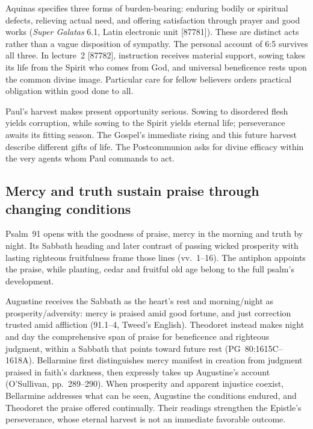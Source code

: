 Aquinas specifies three forms of burden-bearing: enduring bodily or
spiritual defects, relieving actual need, and offering satisfaction through
prayer and good works (\emph{Super Galatas} 6.1, Latin electronic unit
[87781]). These are distinct acts rather than a vague disposition of
sympathy. The personal account of 6:5 survives all three. In lecture~2
[87782], instruction receives material support, sowing takes its life from
the Spirit who comes from God, and universal beneficence rests upon the
common divine image. Particular care for fellow believers orders practical
obligation within good done to all.

Paul's harvest makes present opportunity serious. Sowing to disordered
flesh yields corruption, while sowing to the Spirit yields eternal life;
perseverance awaits its fitting season. The Gospel's immediate rising and
this future harvest describe different gifts of life. The Postcommunion
asks for divine efficacy within the very agents whom Paul commands to act.

\subsection*{Mercy and truth sustain praise through changing conditions\enspace{}}

Psalm~91 opens with the goodness of praise, mercy in the morning and truth
by night. Its Sabbath heading and later contrast of passing wicked
prosperity with lasting righteous fruitfulness frame those lines
(vv.~1--16). The antiphon appoints the praise, while planting, cedar and
fruitful old age belong to the full psalm's development.

Augustine receives the Sabbath as the heart's rest and morning/night as
prosperity/adversity: mercy is praised amid good fortune, and just
correction trusted amid affliction (91.1--4, Tweed's English).
Theodoret instead makes night and day the comprehensive span of praise for
beneficence and righteous judgment, within a Sabbath that points toward
future rest (PG~80:1615C--1618A). Bellarmine first distinguishes mercy
manifest in creation from judgment praised in faith's darkness, then
expressly takes up Augustine's account (O'Sullivan, pp.~289--290).
When prosperity and apparent injustice coexist, Bellarmine addresses what
can be seen, Augustine the conditions endured, and Theodoret the praise
offered continually. Their readings strengthen the Epistle's perseverance,
whose eternal harvest is not an immediate favorable outcome.


